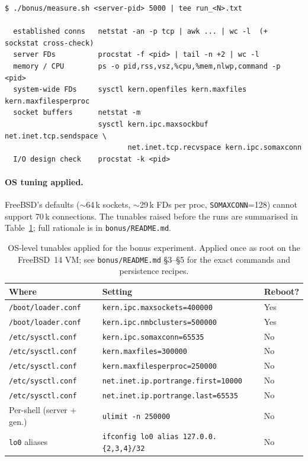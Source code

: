 \documentclass[11pt,a4paper]{article}
\begin{document}
\begin{lstlisting}
$ ./bonus/measure.sh <server-pid> 5000 | tee run_<N>.txt

  established conns   netstat -an -p tcp | awk ... | wc -l  (+ sockstat cross-check)
  server FDs          procstat -f <pid> | tail -n +2 | wc -l
  memory / CPU        ps -o pid,rss,vsz,%cpu,%mem,nlwp,command -p <pid>
  system-wide FDs     sysctl kern.openfiles kern.maxfiles kern.maxfilesperproc
  socket buffers      netstat -m
                      sysctl kern.ipc.maxsockbuf net.inet.tcp.sendspace \
                             net.inet.tcp.recvspace kern.ipc.somaxconn
  I/O design check    procstat -k <pid>
\end{lstlisting}

\paragraph{OS tuning applied.}  FreeBSD's defaults ($\sim$64\,k sockets,
$\sim$29\,k FDs per proc, \texttt{SOMAXCONN}=128) cannot support 70\,k connections.
The tunables raised before the runs are summarised in Table~\ref{tab:bonus-tuning};
full rationale is in \texttt{bonus/README.md}.

\begin{table}[H]
\centering
\small
\begin{tabular}{@{}lll@{}}
\toprule
\textbf{Where} & \textbf{Setting} & \textbf{Reboot?} \\ \midrule
\texttt{/boot/loader.conf} & \texttt{kern.ipc.maxsockets=400000}      & Yes \\
\texttt{/boot/loader.conf} & \texttt{kern.ipc.nmbclusters=500000}     & Yes \\
\texttt{/etc/sysctl.conf}  & \texttt{kern.ipc.somaxconn=65535}        & No  \\
\texttt{/etc/sysctl.conf}  & \texttt{kern.maxfiles=300000}            & No  \\
\texttt{/etc/sysctl.conf}  & \texttt{kern.maxfilesperproc=250000}     & No  \\
\texttt{/etc/sysctl.conf}  & \texttt{net.inet.ip.portrange.first=10000} & No \\
\texttt{/etc/sysctl.conf}  & \texttt{net.inet.ip.portrange.last=65535}  & No \\
Per-shell (server + gen.)  & \texttt{ulimit -n 250000}                & No  \\
\texttt{lo0} aliases       & \texttt{ifconfig lo0 alias 127.0.0.\{2,3,4\}/32} & No \\
\bottomrule
\end{tabular}
\caption{OS-level tunables applied for the bonus experiment.  Applied once as root on
the FreeBSD~14 VM; see \texttt{bonus/README.md} \S3--\S5 for the exact commands and
persistence recipes.}
\label{tab:bonus-tuning}
\end{table}
\end{document}
